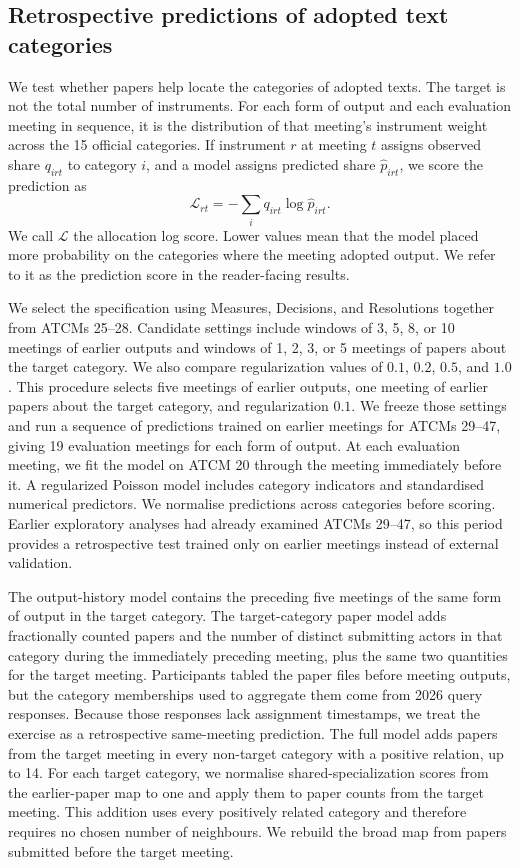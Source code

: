 \documentclass{fun_article}
\begin{document}
\subsection{Retrospective predictions of adopted text categories}\label{sec:prospective-output-forecast}
We test whether papers help locate the categories of adopted texts. The target is not the total number of instruments. For each form of output and each evaluation meeting in sequence, it is the distribution of that meeting's instrument weight across the 15 official categories. If instrument $r$ at meeting $t$ assigns observed share $q_{irt}$ to category $i$, and a model assigns predicted share $\widehat{p}_{irt}$, we score the prediction as
\begin{equation}
 \mathcal{L}_{rt}=-\sum_i q_{irt}\log \widehat{p}_{irt}.
\end{equation}
We call $\mathcal{L}$ the allocation log score. Lower values mean that the model placed more probability on the categories where the meeting adopted output. We refer to it as the prediction score in the reader-facing results.

We select the specification using Measures, Decisions, and Resolutions together from ATCMs 25--28. Candidate settings include windows of 3, 5, 8, or 10 meetings of earlier outputs and windows of 1, 2, 3, or 5 meetings of papers about the target category. We also compare regularization values of $0.1$, $0.2$, $0.5$, and $1.0$. This procedure selects five meetings of earlier outputs, one meeting of earlier papers about the target category, and regularization $0.1$. We freeze those settings and run a sequence of predictions trained on earlier meetings for ATCMs 29--47, giving 19 evaluation meetings for each form of output. At each evaluation meeting, we fit the model on ATCM 20 through the meeting immediately before it. A regularized Poisson model includes category indicators and standardised numerical predictors. We normalise predictions across categories before scoring. Earlier exploratory analyses had already examined ATCMs 29--47, so this period provides a retrospective test trained only on earlier meetings instead of external validation.

The output-history model contains the preceding five meetings of the same form of output in the target category. The target-category paper model adds fractionally counted papers and the number of distinct submitting actors in that category during the immediately preceding meeting, plus the same two quantities for the target meeting. Participants tabled the paper files before meeting outputs, but the category memberships used to aggregate them come from 2026 query responses. Because those responses lack assignment timestamps, we treat the exercise as a retrospective same-meeting prediction. The full model adds papers from the target meeting in every non-target category with a positive relation, up to 14. For each target category, we normalise shared-specialization scores from the earlier-paper map to one and apply them to paper counts from the target meeting. This addition uses every positively related category and therefore requires no chosen number of neighbours. We rebuild the broad map from papers submitted before the target meeting.
\end{document}
